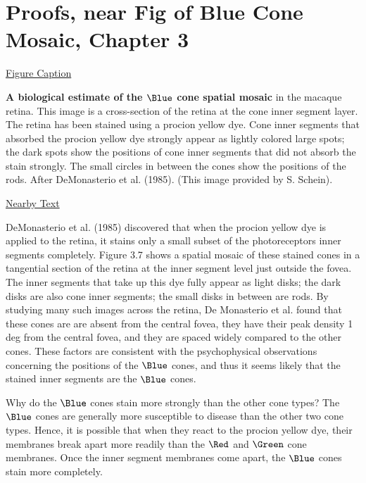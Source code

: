 


\doublesp

\section*{Proofs, near Fig of Blue Cone Mosaic, Chapter 3}


\underline{Figure Caption}

{\bf A biological estimate of the $\Blue$ cone spatial mosaic} in the
macaque retina.  This image is a cross-section of the retina at the
cone inner segment layer.  The retina has been stained using a procion yellow
dye.  Cone inner segments that absorbed the procion yellow dye
strongly appear as lightly colored large spots; the dark spots show
the positions of cone inner segments that did not absorb the stain
strongly.  The small circles in between the cones show the positions
of the rods.  After DeMonasterio et al. (1985). (This image
provided by S. Schein).



\underline{Nearby Text}


DeMonasterio et al. (1985) discovered that when the procion yellow dye
is applied to the retina, it stains only a small subset of the
photoreceptors inner segments completely.  Figure 3.7 shows a spatial
mosaic of these stained cones in a tangential section of the retina at
the inner segment level just outside the fovea.  The inner segments
that take up this dye fully appear as light disks; the dark disks are
also cone inner segments; the small disks in between are rods.  By
studying many such images across the retina, De Monasterio et
al. found that these cones are are absent from the central fovea, they
have their peak density 1 deg from the central fovea, and they are
spaced widely compared to the other cones.  These factors are
consistent with the psychophysical observations concerning the
positions of the $\Blue$ cones, and thus it seems likely that the
stained inner segments are the $\Blue$ cones.  

\newpage

Why do the $\Blue$ cones stain more strongly than the other cone
types?  The $\Blue$ cones are generally more susceptible to disease
than the other two cone types.  Hence, it is possible that when they
react to the procion yellow dye, their membranes break apart more
readily than the $\Red$ and $\Green$ cone membranes.  Once the inner
segment membranes come apart, the $\Blue$ cones stain more completely.


